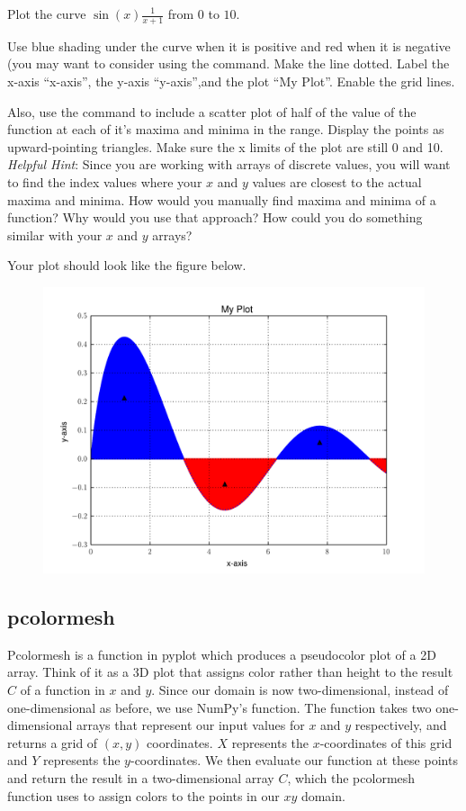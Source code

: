 \begin{problem} Plot the curve $\sin(x)\frac{1}{x+1}$ from $0$ to $10$.

Use blue shading under the curve when it is positive and red when it is negative (you may want to consider using the  command.
Make the line dotted.
Label the x-axis ``x-axis'', the y-axis ``y-axis'',and the plot ``My Plot''.
Enable the grid lines.

Also, use the  command to include a scatter plot of half of the value of the function at each of it's maxima and minima in the range.
Display the points as upward-pointing triangles.
Make sure the x limits of the plot are still 0 and 10.
\emph{Helpful Hint}: Since you are working with arrays of discrete values, you will want to find the index values where your $x$ and $y$ values are closest to the actual maxima and minima.
How would you manually find maxima and minima of a function?
Why would you use that approach?
How could you do something similar with your $x$ and $y$ arrays?

Your plot should look like the figure below.

\begin{figure}[H]
\includegraphics[width=\textwidth]{soln3.pdf}
\label{fig:problem3}
\end{figure}
\end{problem}

\subsection*{pcolormesh}
Pcolormesh is a function in pyplot which produces a pseudocolor plot of a 2D array.
Think of it as a 3D plot that assigns color rather than height to the result $C$ of a function in $x$ and $y$.
Since our domain is now two-dimensional, instead of one-dimensional as before, we use NumPy's  function.
The  function takes two one-dimensional arrays that represent our input values for $x$ and $y$ respectively, and returns a grid of $(x, y)$ coordinates.
$X$ represents the $x$-coordinates of this grid and $Y$ represents the $y$-coordinates.
We then evaluate our function at these points and return the result in a two-dimensional array $C$, which the pcolormesh function uses to assign colors to the points in our $xy$ domain.

